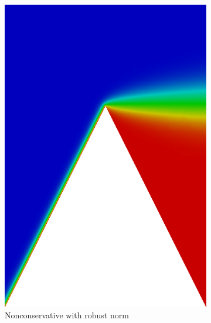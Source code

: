 \documentclass[letterpaper]{article}
\begin{document}
\begin{figure}
\begin{subfigure}[t]{0.4\textwidth}
\includegraphics[width=\textwidth]{figs/Wedge/robust16nc.png}
\caption{Nonconservative with robust norm}
\label{fig:wedgeRobust16nc}
\end{subfigure}
\begin{subfigure}[t]{0.4\textwidth}
\centering

\end{subfigure}
\end{figure}
\end{document}
